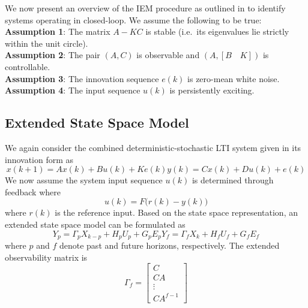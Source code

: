 We now present an overview of the IEM procedure as outlined in \cite{qin2003closed} to identify systems operating in closed-loop. We assume the following to be true:\\
\textbf{Assumption 1}: The matrix $A - KC$ is stable (i.e.\ its eigenvalues lie strictly within the unit circle).\\
\textbf{Assumption 2}: The pair $(A,C)$ is observable and $(A, [B \quad K])$ is controllable.\\
\textbf{Assumption 3}: The innovation sequence $e(k)$ is zero-mean white noise.\\
\textbf{Assumption 4}: The input sequence $u(k)$ is persistently exciting.

\subsection{Extended State Space Model}\label{sec:extended_state_space_model}
We again consider the combined deterministic-stochastic LTI system given in its innovation form as
\begin{subequations}
\begin{equation}x(k+1) = Ax(k) + Bu(k) + Ke(k)\end{equation}
\begin{equation}y(k) = Cx(k) + Du(k) + e(k)\end{equation}
\end{subequations}
We now assume the system input sequence $u(k)$ is determined through feedback where
\begin{equation*}
u(k) = F\big( r(k) - y(k)\big)
\end{equation*}
where $r(k)$ is the reference input. Based on the state space representation, an extended state space model can be formulated as
\begin{subequations}
\begin{equation}Y_p = \Gamma_p X_{k-p} + H_p U_p + G_p E_p\end{equation}
\begin{equation}Y_f = \Gamma_f X_k + H_f U_f + G_f E_f\end{equation}
\end{subequations}
where $p$ and $f$ denote past and future horizons, respectively. The extended observability matrix is
\begin{equation*}
\Gamma_f = \begin{bmatrix}C\\ CA\\ \vdots\\ CA^{f-1}\end{bmatrix}
\end{equation*}

